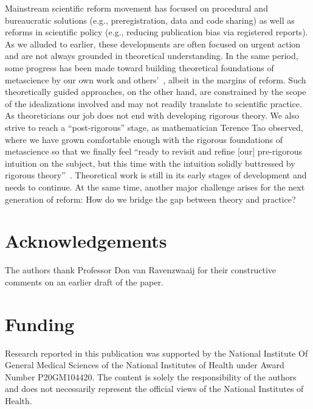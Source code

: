 \documentclass[meta,authordate]{jote-new-article}
\begin{document}
Mainstream scientific reform movement has focused on procedural and bureaucratic solutions (e.g., preregistration, data and code sharing) as well as reforms in scientific policy (e.g., reducing publication bias via registered reports). As we alluded to earlier, these developments are often focused on urgent action and are not always grounded in theoretical understanding. In the same period, some progress has been made toward building theoretical foundations of metascience by our own work and others'~\parencites{bak2022replication}{fanelli2022metric}{fanelli2022tau}{smaldino2016natural}, albeit in the margins of reform. Such theoretically guided approaches, on the other hand, are constrained by the scope of the idealizations involved and may not readily translate to scientific practice. As theoreticians our job does not end with developing rigorous theory. We also strive to reach a ``post-rigorous'' stage, as mathematician Terence Tao observed, where we have grown comfortable enough with the rigorous foundations of metascience so that we finally feel ``ready to revisit and refine [our] pre-rigorous intuition on the subject, but this time with the intuition solidly buttressed by rigorous theory''~\parencite{tao_2007}. Theoretical work is still in its early stages of development and needs to continue. At the same time, another major challenge arises for the next generation of reform: How do we bridge the gap between theory and practice?

\section{Acknowledgements}
The authors thank Professor Don van Ravenzwaaij for their constructive comments on an earlier draft of the paper.

\section{Funding}
Research reported in this publication was supported by the National Institute Of General Medical Sciences of the National Institutes of Health under Award Number P20GM104420. The content is solely the responsibility of the authors and does not necessarily represent the official views of the National Institutes of Health.

\end{document}
